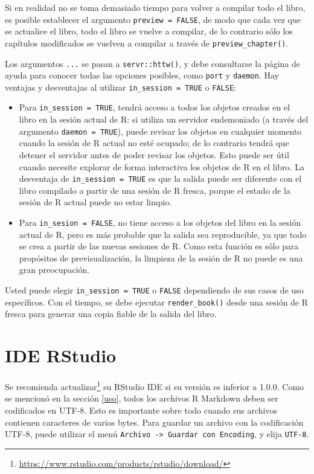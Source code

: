 \documentclass[12pt,]{krantz}
\renewcommand{\href}[2]{#2\footnote{\url{#1}}}
\theoremstyle{definition}
\theoremstyle{definition}
\theoremstyle{definition}
\theoremstyle{remark}
\begin{document}
Si en realidad no se toma demasiado tiempo para volver a compilar todo
el libro, es posible establecer el argumento \texttt{preview\ =\ FALSE},
de modo que cada vez que se actualice el libro, todo el libro se vuelve
a compilar, de lo contrario sólo los capítulos modificados se vuelven a
compilar a través de \texttt{preview\_chapter()}.

Los argumentos \texttt{...} se pasan a \texttt{servr::httw()}, y debe
consultarse la página de ayuda para conocer todas las opciones posibles,
como \texttt{port} y \texttt{daemon}. Hay ventajas y desventajas al
utilizar \texttt{in\_session\ =\ TRUE} o \texttt{FALSE}:

\begin{itemize}
\item
  Para \texttt{in\_session\ =\ TRUE}, tendrá acceso a todos los objetos
  creados en el libro en la sesión actual de R: si utiliza un servidor
  endemoniado (a través del argumento \texttt{daemon\ =\ TRUE}), puede
  revisar los objetos en cualquier momento cuando la sesión de R actual
  no esté ocupado; de lo contrario tendrá que detener el servidor antes
  de poder revisar los objetos. Esto puede ser útil cuando necesite
  explorar de forma interactiva los objetos de R en el libro. La
  desventaja de \texttt{in\_session\ =\ TRUE} es que la salida puede ser
  diferente con el libro compilado a partir de una sesión de R fresca,
  porque el estado de la sesión de R actual puede no estar limpio.
\item
  Para \texttt{in\_sesion\ =\ FALSE}, no tiene acceso a los objetos del
  libro en la sesión actual de R, pero es más probable que la salida sea
  reproducible, ya que todo se crea a partir de las nuevas sesiones de
  R. Como esta función es sólo para propósitos de previsualización, la
  limpieza de la sesión de R no puede es una gran preocupación.
\end{itemize}

Usted puede elegir \texttt{in\_session\ =\ TRUE} o \texttt{FALSE}
dependiendo de sus casos de uso específicos. Con el tiempo, se debe
ejecutar \texttt{render\_book()} desde una sesión de R fresca para
generar una copia fiable de la salida del libro.

\section{IDE RStudio}\label{ide-rstudio}

Se recomienda
\href{https://www.rstudio.com/products/rstudio/download/}{actualizar}
su RStudio IDE si su versión es inferior a 1.0.0. Como se mencionó en la
sección \ref{uso}, todos los archivos R Markdown deben ser codificados
en UTF-8. Esto es importante sobre todo cuando sus archivos contienen
caracteres de varios bytes. Para guardar un archivo con la codificación
UTF-8, puede utilizar el menú
\texttt{Archivo\ -\textgreater{}\ Guardar\ con\ Encoding}, y elija
\texttt{UTF-8}.
\end{document}

